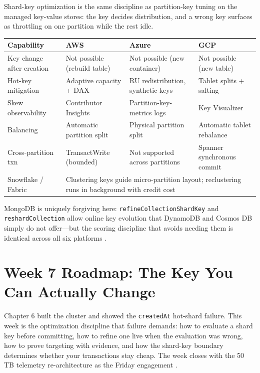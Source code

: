 \begin{crosscloud}
Shard-key optimization is the same discipline as partition-key tuning on the managed key-value stores: the key decides distribution, and a wrong key surfaces as throttling on one partition while the rest idle.

\vspace{2mm}
{\footnotesize
\begin{tabular}{@{}p{2.9cm}p{3.0cm}p{3.0cm}p{3.0cm}@{}} 
\toprule
\textbf{Capability} & \textbf{AWS} & \textbf{Azure} & \textbf{GCP} \\
\midrule
Key change after creation & Not possible (rebuild table) & Not possible (new container) & Not possible (new table) \\
Hot-key mitigation & Adaptive capacity + DAX & RU redistribution, synthetic keys & Tablet splits + salting \\
Skew observability & Contributor Insights & Partition-key-metrics logs & Key Visualizer \\
Balancing & Automatic partition split & Physical partition split & Automatic tablet rebalance \\
Cross-partition txn & TransactWrite (bounded) & Not supported across partitions & Spanner synchronous commit \\
\addlinespace
Snowflake / Fabric & \multicolumn{3}{l}{Clustering keys guide micro-partition layout; reclustering runs in background with credit cost} \\
\bottomrule
\end{tabular}}

\vspace{1mm}
MongoDB is uniquely forgiving here: \texttt{refineCollectionShardKey} and \texttt{reshardCollection} allow online key evolution that DynamoDB and Cosmos DB simply do not offer---but the scoring discipline that avoids needing them is identical across all six platforms \cite{mongodbShardKeyDocs,cosmosPartitionDocs,dynamodbSingleTableDocs}.
\end{crosscloud}

\section{Week 7 Roadmap: The Key You Can Actually Change}
Chapter 6 built the cluster and showed the \texttt{createdAt} hot-shard failure. This week is the optimization discipline that failure demands: how to evaluate a shard key before committing, how to refine one live when the evaluation was wrong, how to prove targeting with evidence, and how the shard-key boundary determines whether your transactions stay cheap. The week closes with the 50 TB telemetry re-architecture as the Friday engagement \cite{mongodbShardKeyDocs,mongodbShardingDocs}.

